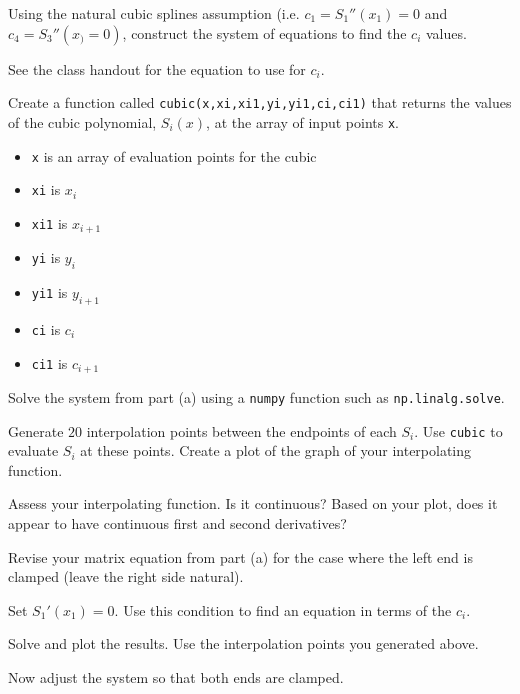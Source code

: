 \documentclass[12pt,letterpaper,noanswers]{exam}
\begin{document}
\begin{questions}
\begin{parts}
\item Using the natural cubic splines assumption (i.e. $c_1 = S_1''(x_1) = 0$ and $c_4 = S_3''(x_) = 0)$, construct the system of equations to find the $c_i$ values.  

See the class handout for the equation to use for $c_i$.







\item Create a function called \texttt{cubic(x,xi,xi1,yi,yi1,ci,ci1)} that returns the values of the cubic polynomial, $S_i(x)$, at the array of input points \texttt{x}.

\begin{itemize}
\item \texttt{x} is an array of evaluation points for the cubic
\item \texttt{xi} is $x_i$
\item \texttt{xi1} is $x_{i+1}$
\item \texttt{yi} is $y_i$
\item \texttt{yi1} is $y_{i+1}$
\item \texttt{ci} is $c_i$
\item \texttt{ci1} is $c_{i+1}$
\end{itemize}


\item Solve the system from part (a) using a \texttt{numpy} function such as \texttt{np.linalg.solve}.  

Generate $20$ interpolation points between the endpoints of each $S_i$.  Use \texttt{cubic} to evaluate $S_i$ at these points.  Create a plot of the graph of your interpolating function.

\item Assess your interpolating function.  Is it continuous?  Based on your plot, does it appear to have continuous first and second derivatives?

\item Revise your matrix equation from part (a) for the case where the left end is clamped (leave the right side natural).  

Set $S_1'(x_1) = 0$.  Use this condition to find an equation in terms of the $c_i$.

\item Solve and plot the results.  Use the interpolation points you generated above.

\item Now adjust the system so that both ends are clamped.  


\end{parts}
\end{questions}
\end{document}
